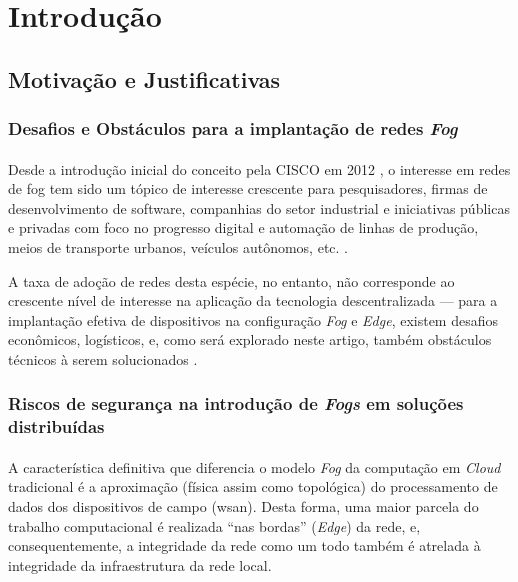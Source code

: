 \documentclass[12pt]{article}
\begin{document}
\tableofcontents

\printglossary[title=Glossário, toctitle=Glossário]

\section{Introdução}
\subsection{Motivação e Justificativas}
\subsubsection{Desafios e Obstáculos para a implantação de redes \textit{Fog}}
\paragraph{}
Desde a introdução inicial do conceito pela CISCO em 2012 \cite{bonomi2012}, o interesse em redes de \gls{fog} tem
sido um tópico de interesse crescente para pesquisadores, firmas de desenvolvimento de software, companhias do setor
industrial e iniciativas públicas e privadas com foco no progresso digital e automação de linhas de produção, meios de
transporte urbanos, veículos autônomos, etc. \cite{srirama2024}. 

A taxa de adoção de redes desta espécie, no entanto, não corresponde ao crescente nível de interesse na
aplicação da tecnologia descentralizada --- para a implantação efetiva de dispositivos na configuração \textit{Fog} e
\textit{Edge}, existem desafios econômicos, logísticos, e, como será explorado neste artigo, também obstáculos técnicos
à serem solucionados \cite{srirama2024}.

\subsubsection{Riscos de segurança na introdução de \textit{Fogs} em soluções distribuídas}
\paragraph{}
A característica definitiva que diferencia o modelo \textit{Fog} da computação em \textit{Cloud} tradicional é a aproximação
(física assim como topológica) do processamento de dados dos dispositivos de campo (\gls{wsan}). Desta forma, uma maior
parcela do trabalho computacional é realizada ``nas bordas'' (\textit{Edge}) da rede, e, consequentemente, a integridade
da rede como um todo também é atrelada à integridade da infraestrutura da rede local.
\end{document}

